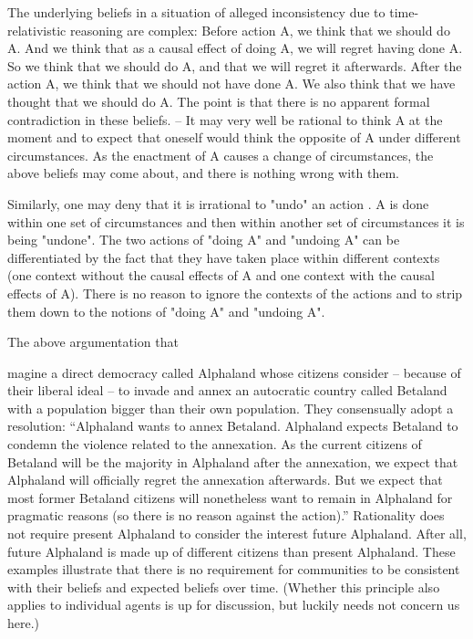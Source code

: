 The underlying beliefs in a situation of alleged inconsistency due to time-relativistic reasoning are complex: Before action A, we think that we should do A. And we think that as a causal effect of doing A, we will regret having done A. So we think that we should do A, and that we will regret it afterwards. After the action A, we think that we should not have done A. We also think that we have thought that we should do A. The point is that there is no apparent formal contradiction in these beliefs. -- It may very well be rational to think A at the moment and to expect that oneself would think the opposite of A under different circumstances. As the enactment of A causes a change of circumstances, the above beliefs may come about, and there is nothing wrong with them. 

Similarly, one may deny that it is irrational to "undo" an action . A is done within one set of circumstances and then within another set of circumstances it is being "undone". The two actions of "doing A" and "undoing A" can be differentiated by the fact that they have taken place within different contexts (one context without the causal effects of A and one context with the causal effects of A). There is no reason to ignore the contexts of the actions and to strip them down to the notions of "doing A" and "undoing A".  

The above argumentation that 

magine a direct democracy called Alphaland whose citizens consider – because of their liberal ideal – to invade and annex an autocratic country called Betaland with a population bigger than their own population. They consensually adopt a resolution: “Alphaland wants to annex Betaland. Alphaland expects Betaland to condemn the violence related to the annexation. As the current citizens of Betaland will be the majority in Alphaland after the annexation, we expect that Alphaland will officially regret the annexation afterwards. But we expect that most former Betaland citizens will nonetheless want to remain in Alphaland for pragmatic reasons (so there is no reason against the action).” Rationality does not require present Alphaland to consider the interest future Alphaland. After all, future Alphaland is made up of different citizens than present Alphaland. These examples illustrate that there is no requirement for communities to be consistent with their beliefs and expected beliefs over time. (Whether this principle also applies to individual agents is up for discussion, but luckily needs not concern us here.) 

